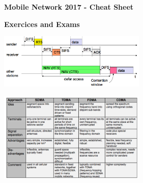 \documentclass[10pt,a4paper,landscape]{article}
\def\labelitemi{--}
\newenvironment{Figure}
  {\par\medskip\noindent\minipage{\linewidth}}
  {\endminipage\par\medskip}
\begin{document}
\raggedright
\footnotesize

\renewcommand\labelitemi{$\triangleright$}
\renewcommand\labelitemii{$\triangleright$}

\begin{multicols*}{4}

\setlength{\columnseprule}{0.25pt}
\setlength{\premulticols}{1pt}
\setlength{\postmulticols}{1pt}
\setlength{\multicolsep}{1pt}
\setlength{\columnsep}{2pt}

\begin{center}
     \small{\textbf{Mobile Network 2017 - Cheat Sheet}} \\
\end{center}

\tiny




\begin{center}
     \small{\textbf{Exercices and Exams}} \\
\end{center}

\tiny




\begin{Figure}
  \includegraphics[width=7cm]{img/cdma_timeline}
\end{Figure}

\begin{Figure}
  \includegraphics[width=7cm]{img/contentionfree}
\end{Figure}


\end{multicols*}
\end{document}
